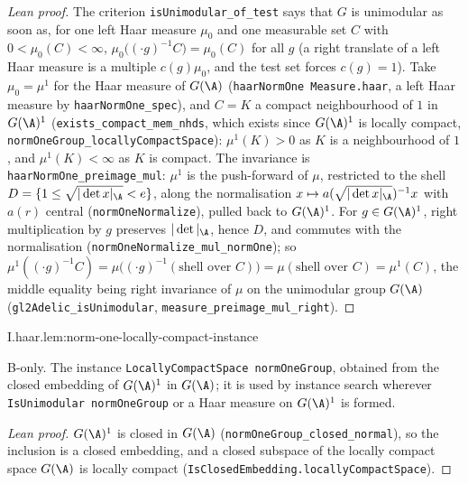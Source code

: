 \begin{proof}[Lean proof]
The criterion \texttt{isUnimodular\_of\_test} says that $G$ is unimodular as soon as, for one left Haar measure $\mu_0$ and one measurable set $C$ with $0<\mu_0(C)<\infty$, $\mu_0\bigl((\cdot g)^{-1}C\bigr)=\mu_0(C)$ for all $g$ (a right translate of a left Haar measure is a multiple $c(g)\mu_0$, and the test set forces $c(g)=1$). Take $\mu_0=\mu^1$ for the Haar measure of $G(\A)$ (\texttt{haarNormOne Measure.haar}, a left Haar measure by \texttt{haarNormOne\_spec}), and $C=K$ a compact neighbourhood of $1$ in $G(\A)^1$ (\texttt{exists\_compact\_mem\_nhds}, which exists since $G(\A)^1$ is locally compact, \texttt{normOneGroup\_locallyCompactSpace}): $\mu^1(K)>0$ as $K$ is a neighbourhood of $1$, and $\mu^1(K)<\infty$ as $K$ is compact. The invariance is \texttt{haarNormOne\_preimage\_mul}: $\mu^1$ is the push-forward of $\mu$, restricted to the shell $D=\{1\le\sqrt{|\det x|_\A}<e\}$, along the normalisation $x\mapsto a(\sqrt{|\det x|_\A})^{-1}x$ with $a(r)$ central (\texttt{normOneNormalize}), pulled back to $G(\A)^1$. For $g\in G(\A)^1$, right multiplication by $g$ preserves $|\det|_\A$, hence $D$, and commutes with the normalisation (\texttt{normOneNormalize\_mul\_normOne}); so $\mu^1((\cdot g)^{-1}C)=\mu\bigl((\cdot g)^{-1}(\text{shell over }C)\bigr)=\mu(\text{shell over }C)=\mu^1(C)$, the middle equality being right invariance of $\mu$ on the unimodular group $G(\A)$ (\texttt{gl2Adelic\_isUnimodular}, \texttt{measure\_preimage\_mul\_right}).
\end{proof}

\begin{lemma}
\bonly
{}
\end{lemma}
\begin{tfformal}{I.haar.lem:norm-one-locally-compact-instance}
\begin{tffidelity}
B-only. The instance \texttt{LocallyCompactSpace normOneGroup}, obtained from the closed embedding of $G(\A)^1$ in $G(\A)$; it is used by instance search wherever \texttt{IsUnimodular normOneGroup} or a Haar measure on $G(\A)^1$ is formed.
\end{tffidelity}
\end{tfformal}
\begin{proof}[Lean proof]
$G(\A)^1$ is closed in $G(\A)$ (\texttt{normOneGroup\_closed\_normal}), so the inclusion is a closed embedding, and a closed subspace of the locally compact space $G(\A)$ is locally compact (\texttt{IsClosedEmbedding.locallyCompactSpace}).
\end{proof}

